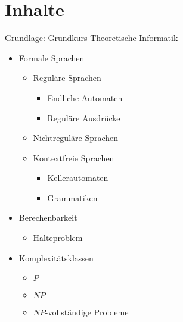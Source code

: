 \newcommand{\customDir}{../}












\maketitle
\newpage
\tableofcontents
\newpage

\chapter*{Inhalte}
Grundlage: Grundkurs Theoretische Informatik \cite{hollas2015grundkurs}
\begin{itemize}
\item Formale Sprachen
\begin{itemize}
\item Reguläre Sprachen
\begin{itemize}
\item Endliche Automaten
\item Reguläre Ausdrücke
\end{itemize}
\item Nichtreguläre Sprachen
\item Kontextfreie Sprachen
\begin{itemize}
\item Kellerautomaten
\item Grammatiken
\end{itemize}
\end{itemize}
\item Berechenbarkeit
\begin{itemize}
\item Halteproblem
\end{itemize}
\item Komplexitätsklassen
\begin{itemize}
\item $P$
\item $NP$
\item $NP$-vollständige Probleme
\end{itemize}
\end{itemize}

